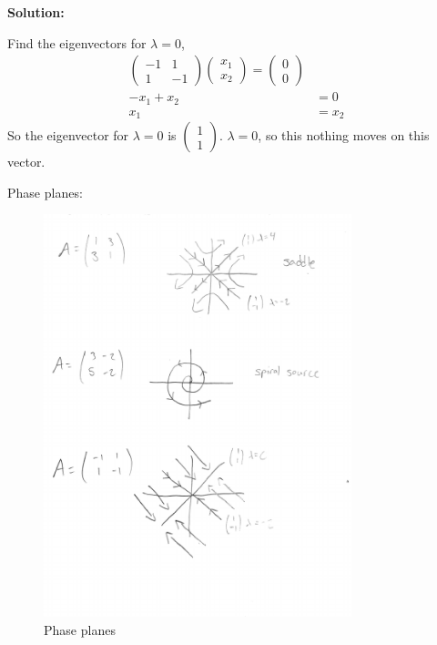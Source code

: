 \documentclass[12pt]{article}
\newenvironment{solution}{
    \textbf{Solution:}
    
}{
    
    \vspace{2em}
}
\begin{document}
\begin{solution}
    Find the eigenvectors for \(\lambda = 0\),
    \[
        \begin{aligned}
            \begin{pmatrix}
                -1 & 1 \\
                1 & -1
            \end{pmatrix} \begin{pmatrix} x_1 \\ x_2 \end{pmatrix} = \begin{pmatrix} 0 \\ 0 \end{pmatrix} \\
            -x_1 + x_2 &= 0 \\
            x_1 &= x_2
        \end{aligned}
    \]
    So the eigenvector for \(\lambda = 0\) is \(\begin{pmatrix} 1 \\ 1 \end{pmatrix}\). \(\lambda = 0 \), so this nothing moves on this vector.

    Phase planes:
    \begin{figure}[H]
        \centering
        \includegraphics[width=0.8\textwidth]{Mid_phase.pdf}
        \caption{Phase planes}
    \end{figure}
    
\end{solution}
\end{document}
